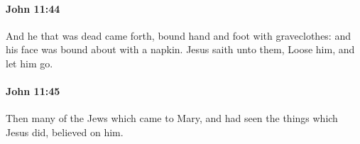 		\paragraph{John 11:44} %
			\label{JOHN-11-44}

			And he that was dead came forth, bound hand and foot with graveclothes: and his face was bound about with a napkin. Jesus saith unto them, Loose him, and let him go.

			\begin{framed}
				\scriptsize
				\begin{compactdesc}
					\item[SBLG] 
				\end{compactdesc}
			\end{framed}

		\paragraph{John 11:45} %
			\label{JOHN-11-45}

			Then many of the Jews which came to Mary, and had seen the things which Jesus did, believed on him.

